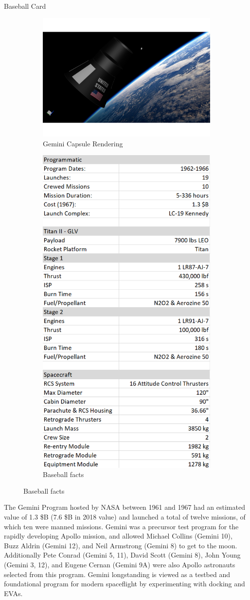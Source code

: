 \documentclass[10pt]{beamer}
\begin{document}
	\begin{frame}{Baseball Card}
	\begin{minipage}{0.49\textwidth}
\begin{figure}
	\centering
	\begin{subfigure}{.5\textwidth}
		\centering
		\includegraphics[width=.4\linewidth]{CapsuleOpaque.png}
		\caption{Gemini Capsule Rendering}
		\label{fig:sub1}
	\end{subfigure}%
	\begin{subfigure}{.5\textwidth}
		\centering
		\includegraphics[width=.4\linewidth]{baseball.png}
		\caption{Baseball facts}
		\label{fig:sub2}
	\end{subfigure}
	\label{fig:BaseballCardFigs}
\end{figure}

The Gemini Program hosted by NASA between 1961 and 1967 had an estimated value of 1.3 \$B (7.6 \$B in 2018 value) and launched a total of twelve missions, of which ten were manned missions. Gemini was a precursor test program for the rapidly developing Apollo mission, and allowed Michael Collins (Gemini 10), Buzz Aldrin (Gemini 12), and Neil Armstrong (Gemini 8) to get to the moon. Additionally Pete Conrad (Gemini 5, 11), David Scott (Gemini 8), John Young (Gemini 3, 12), and Eugene Cernan (Gemini 9A) were also Apollo astronauts selected from this program. Gemini longstanding is viewed as a testbed and foundational program for modern spaceflight by experimenting with docking and EVAs. 





\end{minipage}
\end{frame}
\end{document}
